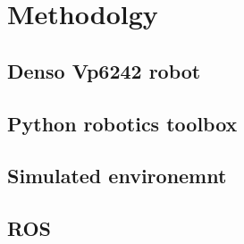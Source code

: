 \chapter{Methodolgy}\label{cap:methods}

\section{Denso Vp6242 robot}
\section{Python robotics toolbox}
\section{Simulated environemnt}
\section{ROS}
